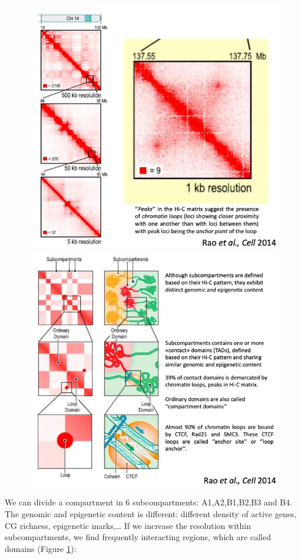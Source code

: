 \begin{figure}[!htb]
   \begin{minipage}{0.48\textwidth}
     \centering
     \includegraphics[width=0.7\linewidth]{../_resources/Screenshot_2022-10-19_at_09-10-50.png}
     \caption{}\label{fig:kb}
   \end{minipage}\hfill
   \begin{minipage}{0.48\textwidth}
     \centering
     \includegraphics[width=0.7\linewidth]{../_resources/Screenshot_2022-10-19_at_09-11-30.png}
     \caption{}\label{fig:sub}
   \end{minipage}
\end{figure}

We can divide a compartment in 6 subcompartments: A1,A2,B1,B2,B3 and B4. The genomic and epigenetic content is different: different density of active genes, CG richness, epigenetic marks,\ldots{} If we increase the resolution within subcompartments, we find frequently interacting regions, which are called domains (Figure \ref{fig:sub}):

